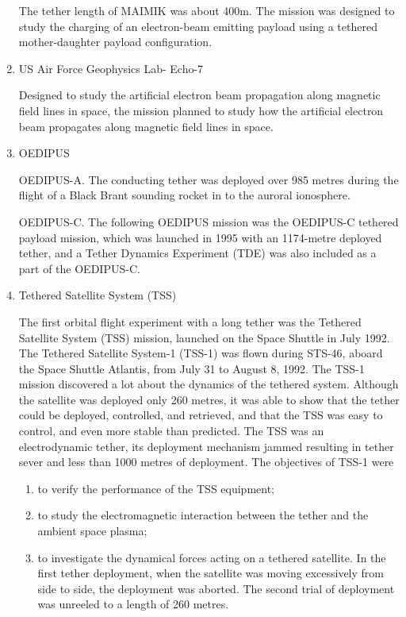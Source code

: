 \begin{enumerate}
	The tether length of MAIMIK was about 400m. The mission was designed to study the charging of an electron-beam emitting payload using a tethered mother-daughter payload configuration. 

\item{US Air Force Geophysics Lab- Echo-7}

Designed to study the artificial electron beam propagation along magnetic field lines in space, the mission planned to study how the artificial electron beam propagates along magnetic field lines in space.
\item{OEDIPUS}

OEDIPUS-A. The conducting tether was deployed over 985 metres during the flight of a Black Brant sounding rocket in to the auroral ionosphere.

OEDIPUS-C. The following OEDIPUS mission was the OEDIPUS-C tethered payload mission, which was launched in 1995 with an 1174-metre deployed tether, and a Tether Dynamics Experiment (TDE) was also included as a part of the OEDIPUS-C.
\item{Tethered Satellite System (TSS)}

The first orbital flight experiment with a long tether was the Tethered Satellite System (TSS) mission, launched on the Space Shuttle in July 1992. The Tethered Satellite System-1 (TSS-1) was flown during STS-46, aboard the Space Shuttle Atlantis, from July 31 to August 8, 1992. The TSS-1 mission discovered a lot about the dynamics of the tethered system. Although the satellite was deployed only 260 metres, it was able to show that the tether could be deployed, controlled, and retrieved, and that the TSS was easy to control, and even more stable than predicted. The TSS was an electrodynamic tether, its deployment mechanism jammed resulting in tether sever and less than 1000 metres of deployment. The objectives of TSS-1 were 
\begin{enumerate}

\item to verify the performance of the TSS equipment; 

\item to study the electromagnetic interaction between the tether and the ambient space plasma; 

\item to investigate the dynamical forces acting on a tethered satellite. In the first tether deployment, when the satellite was moving excessively from side to side, the deployment was aborted. The second trial of deployment was unreeled to a length of 260 metres.


\end{enumerate}
\end{enumerate}
